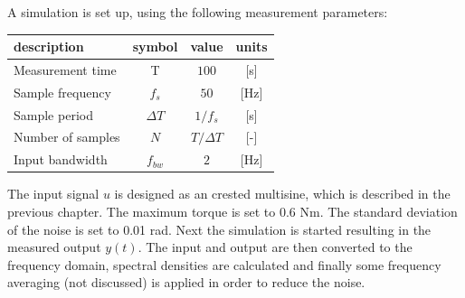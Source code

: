 A simulation is set up, using the following measurement parameters:
			\begin{center}
				\begin{tabular}{lccc}
				\toprule
				description & symbol & value & units  \\
				\midrule
					Measurement time	 &	T    					& $100	$							& [s] 		\\
					Sample frequency	 &		$f_s$   			& $50		$							& [Hz] 	\\
					Sample period				 &	$\Delta T$ & $1/f_s$ 							& [s] 		\\
					Number of samples &		$N$    			& $T/\Delta T	$			& [-]			\\
					Input bandwidth & $f_{bw}$ & $2$                   & [Hz] \\
					\bottomrule
				\end{tabular}
			\end{center}
The input signal $u$ is designed as an crested multisine, which is described in the previous chapter. The maximum torque is set to 0.6 Nm. The standard deviation of the noise is set to 0.01 rad.
Next the simulation is started resulting in the measured output $y(t)$. The input and output are then converted to the frequency domain, spectral densities are calculated and finally some frequency averaging (not discussed) is applied in order to reduce the noise.
